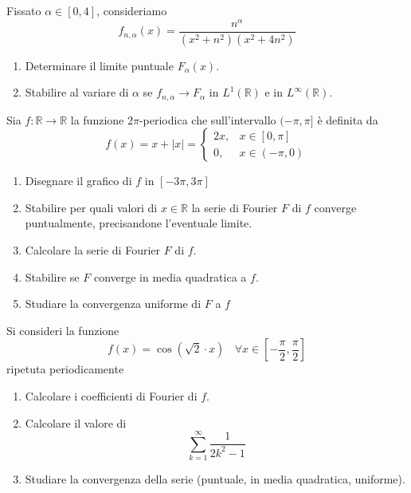 Fissato $\alpha \in [ 0,4]$, consideriamo
\begin{equation*}
f_{n,\alpha }( x) =\frac{n^{\alpha }}{\left( x^{2} +n^{2}\right)\left( x^{2} +4n^{2}\right)}
\end{equation*}
\begin{enumerate}
\item Determinare il limite puntuale $F_{\alpha }( x)$.
\item Stabilire al variare di $\alpha $ se $f_{n,\alpha }\rightarrow F_{\alpha }$ in $L^{1}(\mathbb{R})$ e in $L^{\infty }(\mathbb{R})$.
\end{enumerate}
\Esercizio{}

Sia $f:\mathbb{R}\rightarrow \mathbb{R}$ la funzione $2\pi $-periodica che sull'intervallo $( -\pi ,\pi ]$ è definita da
\begin{equation*}
f( x) =x+| x| =\begin{cases}
2x, & x\in [ 0,\pi ]\\
0, & x\in ( -\pi ,0)
\end{cases}
\end{equation*}
\begin{enumerate}
\item Disegnare il grafico di $f$ in $[ -3\pi ,3\pi ]$
\item Stabilire per quali valori di $x\in \mathbb{R}$ la serie di Fourier $F$ di $f$ converge puntualmente, precisandone l'eventuale limite.
\item Calcolare la serie di Fourier $F$ di $f$.
\item Stabilire se $F$ converge in media quadratica a $f$.
\item Studiare la convergenza uniforme di $F$ a $f$
\end{enumerate}
\Esercizio{}

Si consideri la funzione
\begin{equation*}
f( x) =\cos\left(\sqrt{2} \cdotp x\right) \ \ \ \ \forall x\in \left[ -\frac{\pi }{2} ,\frac{\pi }{2}\right]
\end{equation*}
ripetuta periodicamente
\begin{enumerate}
\item Calcolare i coefficienti di Fourier di $f$.
\item Calcolare il valore di\begin{equation*}
\sum\limits ^{\infty }_{k=1}\frac{1}{2k^{2} -1}
\end{equation*}
\item Studiare la convergenza della serie (puntuale, in media quadratica, uniforme).
\end{enumerate}
\ParteSoluzioni
\Soluzione

